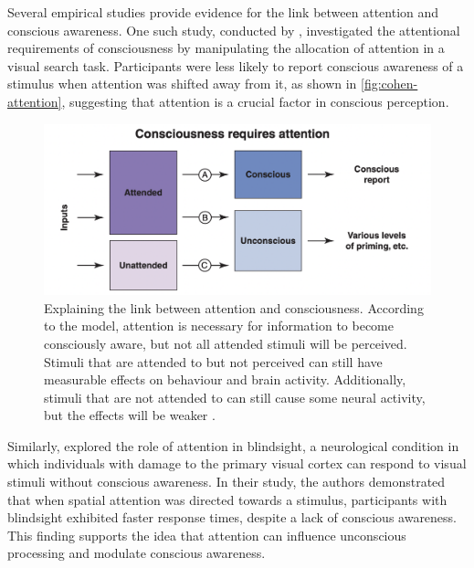 \documentclass[10pt]{article}
\begin{document}
\begin{sloppypar}
  Several empirical studies provide evidence for the link between attention and conscious awareness. One such study, conducted by \cite{cohen_attentional_2012}, investigated the attentional requirements of consciousness by manipulating the allocation of attention in a visual search task. Participants were less likely to report conscious awareness of a stimulus when attention was shifted away from it, as shown in \autoref{fig:cohen-attention}, suggesting that attention is a crucial factor in conscious perception.

  \begin{figure}[ht]
    \centering
    \includegraphics[width=\textwidth]{figures/attention.png}
    \caption[Explaining the link between attention and consciousness. According to the model, attention is necessary for information to become consciously aware, but not all attended stimuli will be perceived. Stimuli that are attended to but not perceived can still have measurable effects on behaviour and brain activity. Additionally, stimuli that are not attended to can still cause some neural activity, but the effects will be weaker.]{Explaining the link between attention and consciousness. According to the model, attention is necessary for information to become consciously aware, but not all attended stimuli will be perceived. Stimuli that are attended to but not perceived can still have measurable effects on behaviour and brain activity. Additionally, stimuli that are not attended to can still cause some neural activity, but the effects will be weaker \citep{cohen_attentional_2012}.}
    \label{fig:cohen-attention}
  \end{figure}

  Similarly, \cite{kentridge_spatial_2004} explored the role of attention in blindsight, a neurological condition in which individuals with damage to the primary visual cortex can respond to visual stimuli without conscious awareness. In their study, the authors demonstrated that when spatial attention was directed towards a stimulus, participants with blindsight exhibited faster response times, despite a lack of conscious awareness. This finding supports the idea that attention can influence unconscious processing and modulate conscious awareness.


\end{sloppypar}
\end{document}
